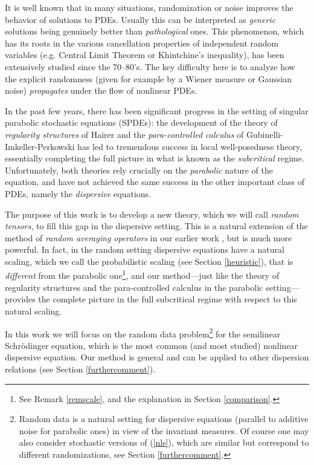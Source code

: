 \documentclass[11 pt,reqno]{amsart}
\theoremstyle{definition}
\theoremstyle{remark}
\numberwithin{equation}{section}
\begin{document}
 It is well known that in many situations, randomization or noise improves the behavior of solutions to PDEs. Usually this can be interpreted as \emph{generic} solutions being genuinely better than \emph{pathological} ones. This phenomenon, which has its roots in the various cancellation properties of independent random variables (e.g. Central Limit Theorem or Khintchine's inequality), has been extensively studied since the 70--80's. The key difficulty here is to analyze how the explicit randomness (given for example by a Wiener measure or Gaussian noise) \emph{propagates} under the flow of nonlinear PDEs.
 
In the past few years, there has been significant progress in the setting of singular parabolic stochastic equations (SPDEs): the development of the theory of \emph{regularity structures} of Hairer and the \emph{para-controlled calculus} of Gubinelli-Imkeller-Perkowski has led to tremendous success in local well-posedness theory, essentially completing the full picture in what is known as the \emph{subcritical} regime. Unfortunately, both theories rely crucially on the \emph{parabolic} nature of the equation, and have not achieved the same success in the other important class of PDEs, namely the \emph{dispersive} equations.

The purpose of this work is to develop a new theory, which we will call \emph{random tensors}, to fill this gap in the dispersive setting. This is a natural extension of the method of \emph{random averaging operators} in our earlier work \cite{DNY}, but is much more powerful. In fact, in the random setting dispersive equations have a natural scaling, which we call the probabilistic scaling (see Section \ref{heuristic}), that is \emph{different} from the parabolic one\footnote{See Remark \ref{remscale}, and the explanation in Section \ref{comparison}.}, and our method---just like the theory of regularity structures and the para-controlled calculus in the parabolic setting---provides the complete picture in the full subcritical regime with respect to this natural scaling.

In this work we will focus on the random data problem\footnote{Random data is a natural setting for dispersive equations (parallel to additive noise for parabolic ones) in view of the invariant measures. Of course one may also consider stochastic versions of (\ref{nls}), which are similar but correspond to different randomizations, see Section \ref{furthercomment}.} for the semilinear Schr\"{o}dinger equation, which is the most common (and most studied) nonlinear dispersive equation. Our method is general and can be applied to other dispersion relations (see Section \ref{furthercomment}).
\end{document}
